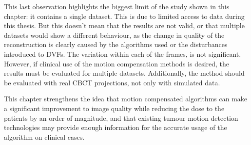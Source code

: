 This last observation highlights the biggest limit of the study shown in this chapter: it contains a single dataset. This is due to limited access to data during this thesis. But this doesn't mean that the results are not valid, or that multiple datasets would show a different behaviour, as the change in quality of the reconstruction is clearly caused by the algorithms used or the disturbances introduced to DVFs. The variation within each of the frames, is not  significant. However, if clinical use of the motion compensation methods is desired, the results must be evaluated for multiple datasets. Additionally, the method should be evaluated with real CBCT projections, not only with simulated data.

This chapter strengthens the idea that motion compensated algorithms can make a significant improvement to image quality while reducing the dose to the patients by an order of magnitude, and that existing tumour motion detection technologies may provide enough information for the accurate usage of the algorithm on clinical cases. 




